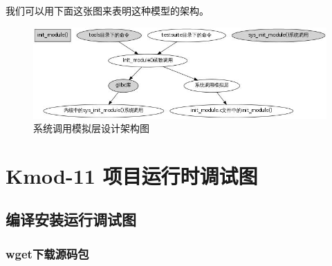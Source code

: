 我们可以用下面这张图来表明这种模型的架构。

\begin{figure}[htbp]
\centering
\includegraphics{./figures/sys_sim.jpg}
\caption{系统调用模拟层设计架构图}
\end{figure}

\chapter{Kmod-11 项目运行时调试图}

\section{编译安装运行调试图}

\subsection{wget下载源码包}

